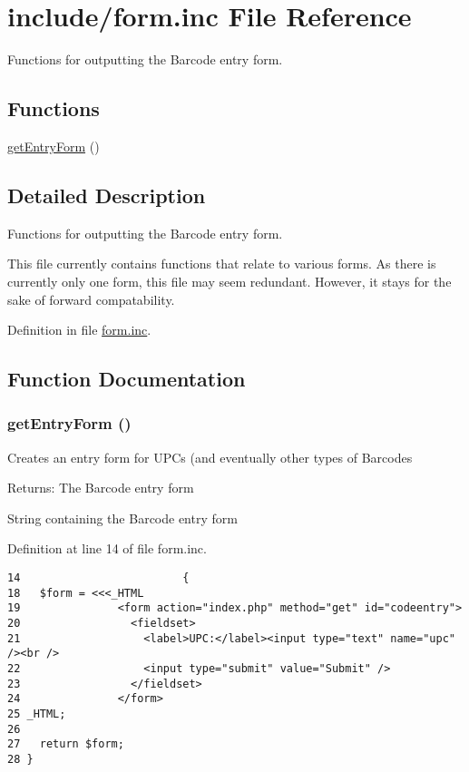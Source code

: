 \hypertarget{form_8inc}{
\section{include/form.inc File Reference}
\label{form_8inc}
}
Functions for outputting the Barcode entry form. 

\subsection*{Functions}
\begin{CompactItemize}
\item 
\hyperlink{form_8inc_839e205cae656bea01ea99e2de94ef1e}{getEntryForm} ()
\end{CompactItemize}


\subsection{Detailed Description}
Functions for outputting the Barcode entry form. 

This file currently contains functions that relate to various forms. As there is currently only one form, this file may seem redundant. However, it stays for the sake of forward compatability. 

Definition in file \hyperlink{form_8inc-source}{form.inc}.

\subsection{Function Documentation}
\hypertarget{form_8inc_839e205cae656bea01ea99e2de94ef1e}{
\subsubsection{\setlength{\rightskip}{0pt plus 5cm}getEntryForm ()}}
\label{form_8inc_839e205cae656bea01ea99e2de94ef1e}


Creates an entry form for UPCs (and eventually other types of Barcodes \begin{Desc}
\item[Returns:]The Barcode entry form \end{Desc}


String containing the Barcode entry form 

Definition at line 14 of file form.inc.

\begin{Code}\begin{verbatim}14                         {
18   $form = <<<_HTML
19               <form action="index.php" method="get" id="codeentry">
20                 <fieldset>
21                   <label>UPC:</label><input type="text" name="upc" /><br />
22                   <input type="submit" value="Submit" />
23                 </fieldset>
24               </form>
25 _HTML;
26 
27   return $form;
28 }\end{verbatim}
\end{Code}


